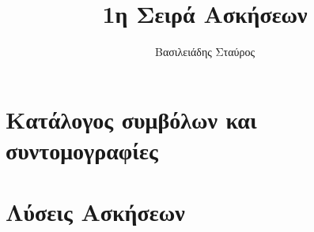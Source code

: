 \documentclass[twoside, openright, hidelinks, a4paper, 12pt]{book}%
\title{\color{teal}1η Σειρά Ασκήσεων}
\author{Βασιλειάδης Σταύρος}
\newcommand\AtPageUpperRight[1]{\AtPageUpperLeft{%
		\put(\LenToUnit{\paperwidth},\LenToUnit{0\paperheight}){#1}%
}}%
\newcommand\AtPageLowerRight[1]{\AtPageLowerLeft{%
		\put(\LenToUnit{\paperwidth},\LenToUnit{0\paperheight}){#1}%
}}%
\newcommand{\beautify}{%
	\AddToShipoutPictureBG{%
		\AtPageUpperLeft{\put(0,-25){\pgfornament[width=1.75cm]{61}}}
		\AtPageUpperRight{\put(-50,-25){\pgfornament[width=1.75cm,symmetry=v]{61}}}
		\AtPageLowerLeft{\put(0,25){\pgfornament[width=1.75cm,symmetry=h]{61}}}
		\AtPageLowerRight{\put(-50,25){\pgfornament[width=1.75cm,symmetry=c]{61}}}
	}
}
\newcommand{\simplify}{%
}
\begin{document}
	




\renewcommand{\contentsname}{Περιεχόμενα}
\renewcommand{\listfigurename}{Λίστα Σχημάτων}
\renewcommand{\listtablename}{Λίστα Πινάκων}
\renewcommand{\chaptername}{\centering{ΜΕΡΟΣ}}
\renewcommand{\appendixname}{Παράρτημα}
\renewcommand{\bibname}{Βιβλιογραφία}
\renewcommand\thesection{\color{violet}\arabic{section}}
\chapterfont{\color{magenta}}

\makeatletter
\newcommand*{\greek}[1]{%
	\expandafter\@greek\csname c@#1\endcsname
}
\newcommand*{\@greek}[1]{%
	$\ifcase#1\or\alpha\or\beta\or\gamma\or\delta\or\varepsilon
	\or\zeta\or\eta\or\theta\or\iota\or\kappa\or\lambda
	\or\mu\or\nu\or\xi\or o\or\pi\or\varrho\or\sigma
	\or\tau\or\upsilon\or\phi\or\chi\or\psi\or\omega
	\else\@ctrerr\fi$
}

\renewcommand{\thesubsection}{\thesection\;-\;\greek{subsection}}


\setlength{\parskip}{0.5em}     %


\setlength{\parskip}{1em}       %
\begingroup
\pagestyle{empty}

	\tableofcontents
\endgroup

	\clearpage

	\cleardoublepage
\doublespacing
\chapter{Κατάλογος συμβόλων και συντομογραφίες}
\label{ch:ChapterName}
\simplify
	
\clearpage

\cleardoublepage
\setcounter{page}{1}
	\chapter{Λύσεις Ασκήσεων}
	\label{ch:ChapterName}
	\simplify


	
	
	\newpage
	
	\newpage
\end{document}
